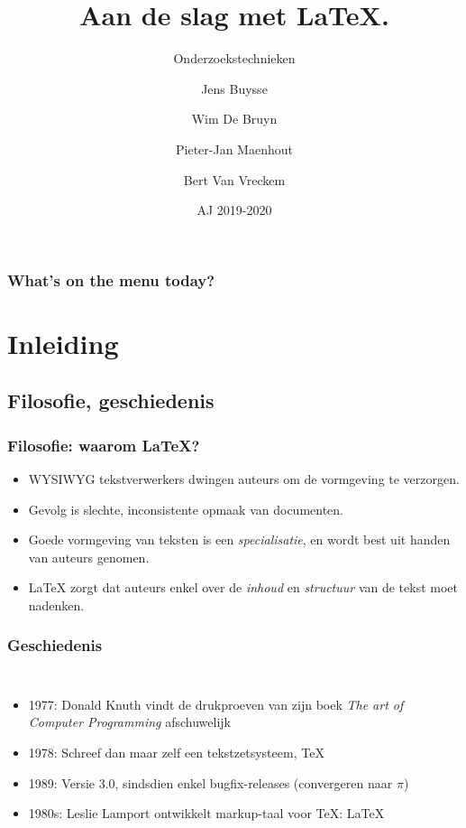 \documentclass[aspectratio=169]{beamer}
\title{Aan de slag met \LaTeX.}
\subtitle{Onderzoekstechnieken}
\author{Jens Buysse \and Wim {De Bruyn} \and Pieter-Jan Maenhout \and Bert {Van Vreckem}}
\date{AJ 2019-2020}
\begin{document}
\begin{frame}
  \maketitle
\end{frame}

\begin{frame}
  \frametitle{What's on the menu today?}
  
  \tableofcontents
\end{frame}


\section{Inleiding}

\subsection{Filosofie, geschiedenis}

\begin{frame}
  \frametitle{Filosofie: waarom {\LaTeX}?}
  
  \begin{itemize}
    \item<+-> WYSIWYG tekstverwerkers dwingen auteurs om de vormgeving te verzorgen.
    \item<+-> Gevolg is slechte, inconsistente opmaak van documenten.
    \item<+-> Goede vormgeving van teksten is een \emph{specialisatie}, en wordt best
    uit handen van auteurs genomen.
    \item<+-> {\LaTeX} zorgt dat auteurs enkel over de \emph{inhoud} en \emph{structuur} van de tekst moet nadenken.
  \end{itemize}
\end{frame}

\begin{frame}
  \frametitle{Geschiedenis}
  
  \begin{columns}[c]
    
    \begin{itemize}
      \item<+-> 1977: Donald Knuth vindt de drukproeven van zijn boek \emph{The art of Computer Programming} afschuwelijk
      \item<+-> 1978: Schreef dan maar zelf een tekstzetsysteem, {\TeX}
      \item<+-> 1989: Versie 3.0, sindsdien enkel bugfix-releases (convergeren naar $\pi$)
      \item<+-> 1980s: Leslie Lamport ontwikkelt markup-taal voor {\TeX}: {\LaTeX}
    \end{itemize}
    
    \begin{center}
    \end{center}
    
  \end{columns}
\end{frame}
\end{document}
